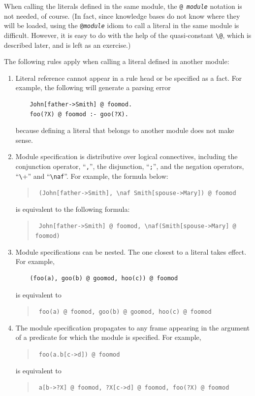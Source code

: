 \documentclass[11pt]{article}
\makeatletter
\newcommand{\thismodule}{{\tt \bs{}@}\xspace}
\newcommand{\bs}{\textbackslash}
\newcommand{\PLGNAF}{\mbox{\texttt{\bs}+}\xspace}
\newcommand{\RULELOGNAF}{{\texttt{{\bs}naf}}\xspace}
\makeatother
\begin{document}
When calling the literals defined in the same module, the {\tt @{\it
    module}} notation is not needed, of course. (In fact, since knowledge
bases
do not know where they will be loaded, using the \texttt{@\textit{module}}   idiom to call a
literal in the same module is difficult. However, it is easy to do with the help
of the quasi-constant \thismodule, which is described later, and is left
as an exercise.)

The following rules apply when calling a literal defined in another module:
\begin{enumerate}
\item Literal reference cannot appear in a rule head or be specified as
  a fact. For example, the following will generate
  a parsing error
  \begin{verbatim}
    John[father->Smith] @ foomod.
    foo(?X) @ foomod :- goo(?X).
  \end{verbatim}
  because defining a literal that belongs to another module does not make
  sense.
  
\item Module specification is distributive over logical connectives,
  including the conjunction operator, ``\verb|,|'', the disjunction,
  ``\verb|;|'', and the negation operators, ``\PLGNAF'' and
  ``\RULELOGNAF''. For example, the formula below:
  \begin{quote}
    {\tt
    (John[father->Smith], \RULELOGNAF Smith[spouse->Mary]) @ foomod
    }
  \end{quote}
  is equivalent to the following formula:
  \begin{quote}
    {\tt
    John[father->Smith] @ foomod, \RULELOGNAF (Smith[spouse->Mary] @ foomod)
    }
  \end{quote}

\item Module specifications can be nested. The one closest to a literal
  takes effect. For example,
  \begin{verbatim}
    (foo(a), goo(b) @ goomod, hoo(c)) @ foomod
  \end{verbatim}
  is equivalent to
  \begin{quote}
    {\tt
      foo(a) @ foomod, goo(b) @ goomod, hoo(c) @ foomod
    }
  \end{quote}
  
\item The module specification propagates to any frame appearing
  in the argument of a predicate for which the module is
  specified. For example,
  \begin{quote}
    {\tt
    foo(a.b[c->d]) @ foomod
    }
  \end{quote}
  is equivalent to
  \begin{quote}
    {\tt
    a[b->?X] @ foomod, ?X[c->d] @ foomod, foo(?X) @ foomod
    }
  \end{quote}
  

\end{enumerate}
\end{document}
